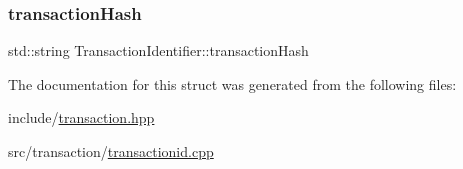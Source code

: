 \subsubsection{\texorpdfstring{transaction\+Hash}{transactionHash}}
{\footnotesize\ttfamily std\+::string Transaction\+Identifier\+::transaction\+Hash}



The documentation for this struct was generated from the following files\+:\begin{DoxyCompactItemize}
\item 
include/\mbox{\hyperlink{transaction_8hpp}{transaction.\+hpp}}\item 
src/transaction/\mbox{\hyperlink{transactionid_8cpp}{transactionid.\+cpp}}\end{DoxyCompactItemize}
